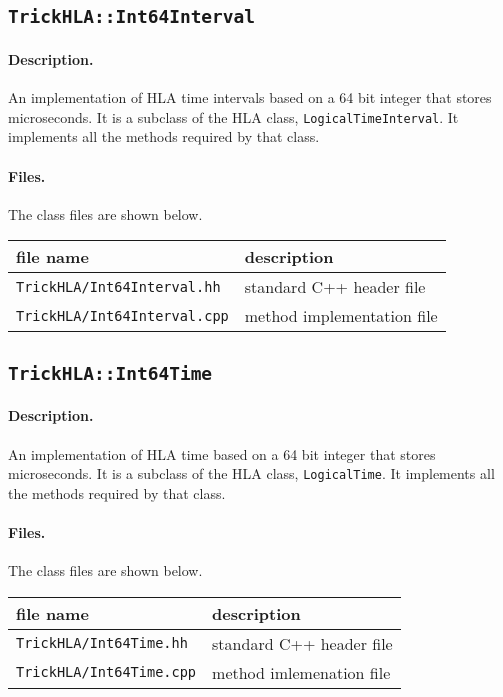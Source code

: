 \subsection{{\tt TrickHLA::Int64Interval}}

\paragraph{Description.}
An implementation of HLA time intervals based on a 64 bit integer that stores
microseconds.
It is a subclass of the HLA class, {\tt LogicalTimeInterval}.
It implements all the methods required by that class.

\paragraph{Files.}
The class files are shown below.
   
{
  \scriptsize
  \begin{tabular}{|l|l|} 
    \hline
    file name & description \\
    \hline \hline
    {\tt TrickHLA/Int64Interval.hh} 
    & standard C++ header file
    \\ \hline
    {\tt TrickHLA/Int64Interval.cpp} 
    & method implementation file
    \\ \hline
  \end{tabular}
}

\subsection{{\tt TrickHLA::Int64Time}}
\paragraph{Description.}
An implementation of HLA time based on a 64 bit integer that stores
microseconds.
It is a subclass of the HLA class, {\tt LogicalTime}.
It implements all the methods required by that class.

\paragraph{Files.}
The class files are shown below.
   
{
  \scriptsize
  \begin{tabular}{|l|l|} 
    \hline
    file name & description \\
    \hline \hline
    {\tt TrickHLA/Int64Time.hh} 
    & standard C++ header file
    \\ \hline
    {\tt TrickHLA/Int64Time.cpp} 
    & method imlemenation file
    \\ \hline
  \end{tabular}
}

